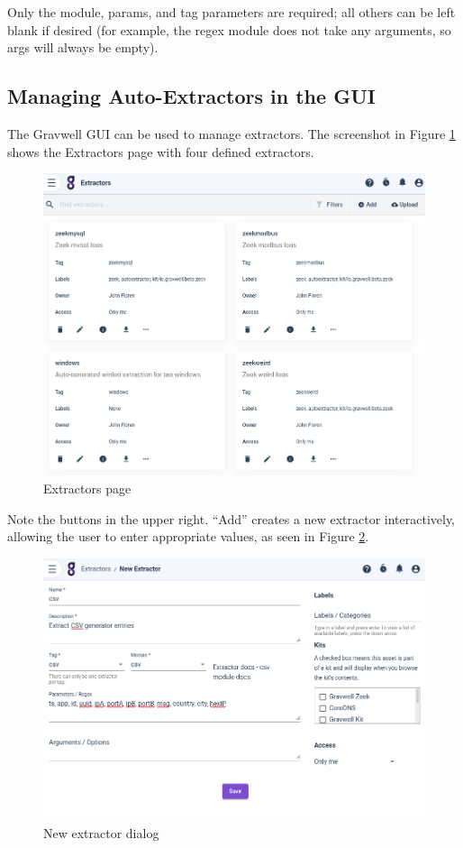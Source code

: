 Only the module, params, and tag parameters are required;
all others can be left blank if desired (for example, the regex module
does not take any arguments, so args will always be empty).

\subsection{Managing Auto-Extractors in the GUI}
The Gravwell GUI can be used to manage extractors. The screenshot in Figure \ref{fig:extractors-page}
shows the Extractors page with four defined extractors.

\begin{figure}
	\includegraphics[width=0.7\linewidth]{images/extractors-page.png}
	\caption{Extractors page}
	\label{fig:extractors-page}
\end{figure}

Note the buttons in the upper right. ``Add'' creates a new extractor
interactively, allowing the user to enter appropriate values, as seen in Figure \ref{fig:new-extractor}.

\begin{figure}
	\includegraphics[width=0.7\linewidth]{images/new-extractor.png}
	\caption{New extractor dialog}
	\label{fig:new-extractor}
\end{figure}

